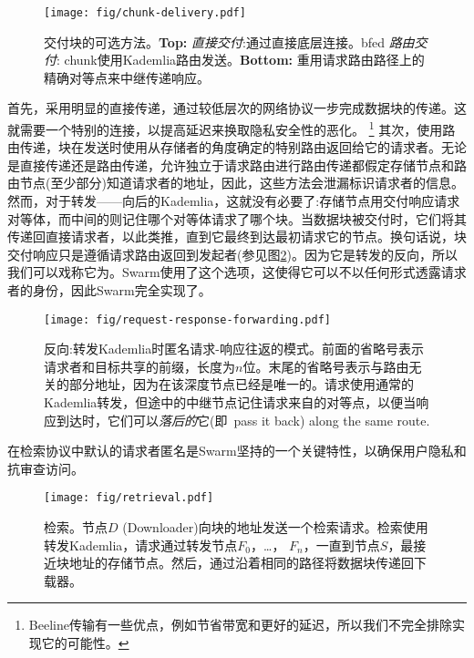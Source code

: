 \begin{figure}[htbp]
   \centering
   \texttt{[image: fig/chunk-delivery.pdf]}
   \caption[交付块的可选方法:直接、路由和向后\statusgreen]{交付块的可选方法。\textbf{Top:} \emph{直接交付}:通过直接底层连接。bfed \emph{路由交付}: chunk使用Kademlia路由发送。\textbf{Bottom:} 重用请求路由路径上的精确对等点来中继传递响应。}
   \label{fig:chunk-delivery}
\end{figure}

首先，采用明显的直接传递，通过较低层次的网络协议一步完成数据块的传递。这就需要一个特别的连接，以提高延迟来换取隐私安全性的恶化。%
%
\footnote{Beeline传输有一些优点，例如节省带宽和更好的延迟，所以我们不完全排除实现它的可能性。 
}
其次，使用路由传递，块在发送时使用从存储者的角度确定的特别路由返回给它的请求者。无论是直接传递还是路由传递，允许独立于请求路由进行路由传递都假定存储节点和路由节点(至少部分)知道请求者的地址，因此，这些方法会泄漏标识请求者的信息。然而，对于转发——向后的Kademlia，这就没有必要了:存储节点用交付响应请求对等体，而中间的则记住哪个对等体请求了哪个块。当数据块被交付时，它们将其传递回直接请求者，以此类推，直到它最终到达最初请求它的节点。换句话说，块交付响应只是遵循请求路由返回到发起者(参见图\ref{fig:request-response})。因为它是转发的反向，所以我们可以戏称它为。Swarm使用了这个选项，这使得它可以不以任何形式透露请求者的身份，因此Swarm完全实现了。 

\begin{figure}[htbp]
   \centering
   \texttt{[image: fig/request-response-forwarding.pdf]}
   \caption[反向:转发Kademlia 时匿名请求-响应往返的模式\statusgreen]{反向:转发Kademlia时匿名请求-响应往返的模式。前面的省略号表示请求者和目标共享的前缀，长度为$n$位。末尾的省略号表示与路由无关的部分地址，因为在该深度节点已经是唯一的。请求使用通常的Kademlia转发，但途中的中继节点记住请求来自的对等点，以便当响应到达时，它们可以\emph{落后的}它(即\ pass it back) along the same route.}
   \label{fig:request-response}
\end{figure}

在检索协议中默认的请求者匿名是Swarm坚持的一个关键特性，以确保用户隐私和抗审查访问。

\begin{figure}[htbp]
   \centering
   \texttt{[image: fig/retrieval.pdf]}
   \caption[检索\statusgreen]{检索。节点$D$ (Downloader)向块的地址发送一个检索请求。检索使用转发Kademlia，请求通过转发节点$F_0$，…， $F_n$，一直到节点$S$，最接近块地址的存储节点。然后，通过沿着相同的路径将数据块传递回下载器。}
   \label{fig:retrieval}
\end{figure}

